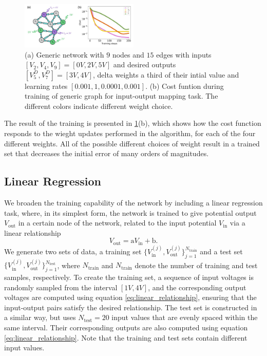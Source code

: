 \documentclass[reprint,superscriptaddress,prb,showkeys]{revtex4-2}
\begin{document}
\begin{figure}[h]
    \centering
    \includegraphics[width=0.5\textwidth]{plots/general_network/mse_general.pdf}
    \caption{(a) Generic network with $9$ nodes and $15$ edges with inputs $[V_{2}, V_{4}, V_{9}] = [0V, 2V, 5V]$ and desired outputs $[V_{5}^D, V_{7}^D] = [3V, 4V]$, delta weights a third of their intial value and learning rates $[0.001, 1, 0.0001, 0.001]$. (b) Cost funtion during training of generic graph for input-output mapping task. The different colors indicate different weight choice.}\label{fig:mse_general}
\end{figure} 

The result of the training is presented in \cref{fig:mse_general}(b), which shows how the cost function responds to the wieght updates performed in the algorithm, for each of the four different weights. All of the possible different choices of weight result in a trained set that decreases the initial error of many orders of magnitudes. 

\subsection{\label{sec:linear_regression}Linear Regression}

We broaden the training capability of the network by including a linear regression task, where, in its simplest form, the network is trained to give potential output $V_{\text{out}}$ in a certain node of the network, related to the input potential $V_{\text{in}}$ via a linear relationship
\begin{equation}
    V_{\text{out}} = \text{a} V_{\text{in}} + \text{b}.
\label{eq:linear_relationship}
\end{equation}
We generate two sets of data, a training set $ \{ V_{\text{in}}^{(j)}, V_{\text{out}}^{(j)} \}_{j=1}^{N_{\text{train}}}$ and a test set $ \{ V_{\text{in}}^{(j)}, V_{\text{out}}^{(j)} \}_{j=1}^{N_{\text{test}}}$, where $N_{\text{train}}$ and $N_{\text{train}}$ denote the number of training and test samples, respectively. To create the training set, a sequence of input voltages is randomly sampled from the interval $[1V, 4V]$, and the corresponding output voltages are computed using equation \cref{eq:linear_relationship}, ensuring that the input-output pairs satisfy the desired relationship.
The test set is constructed in a similar way, but uses $N_{\text{test}}=20$ input values that are evenly spaced within the same interval. Their corresponding outputs are also computed using equation \cref{eq:linear_relationship}. Note that the training and test sets contain different input values.
\end{document}
